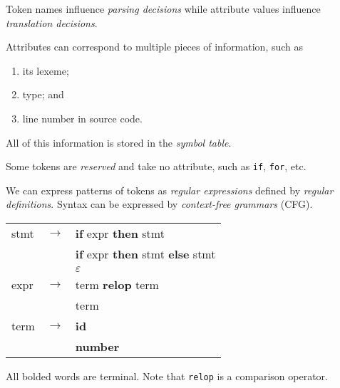 Token names influence \emph{parsing decisions} while
attribute values influence \emph{translation decisions}.

Attributes can correspond to multiple pieces of information, such as
\begin{enumerate}
    \item its lexeme;
    \item type; and
    \item line number in source code.
\end{enumerate}
All of this information is stored in the \emph{symbol table}.

Some tokens are \emph{reserved} and take no attribute,
such as \texttt{if}, \texttt{for}, etc.

We can express patterns of tokens as \emph{regular expressions}
defined by \emph{regular definitions}.
Syntax can be expressed by \emph{context-free grammars} (CFG).

\begin{example}
    \hfill
    \begin{center}
        \ttfamily
        \begin{tabular}{lll}
            \toprule
            stmt & $\to$ & \textbf{if} expr \textbf{then} stmt \\
                 &       & \textbf{if} expr \textbf{then} stmt \textbf{else} stmt \\
                 &       & $\varepsilon$ \\
            expr & $\to$ & term \textbf{relop} term \\
                 &       & term \\
            term & $\to$ & \textbf{id} \\
                 &       & \textbf{number} \\
            \bottomrule
        \end{tabular}
    \end{center}
    All bolded words are terminal.
    Note that \texttt{relop} is a comparison operator.
\end{example}

